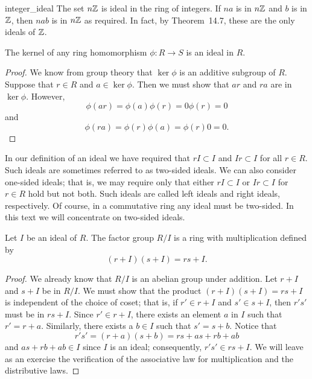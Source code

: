  
\begin{example}{integer_ideal}
The set $n {\Bbb Z}$ is ideal in the ring of integers. If $na$ is in
$n{\Bbb Z}$ and $b$ is in ${\Bbb Z}$, then $nab$ is in  $n {\Bbb Z}$
as required. In fact, by Theorem~14.7, these are the only
ideals of ${\Bbb Z}$.
\end{example}
 
 
\begin{proposition}
The kernel of any ring homomorphism $\phi : R \rightarrow S$ is an
ideal in $R$. 
\end{proposition}
 
 
\begin{proof}
We know from group theory that $\ker \phi$ is an additive subgroup of
$R$. Suppose that $r \in R$ and $a \in \ker \phi$. Then we must show
that $ar$ and $ra$ are in $\ker \phi$. However, 
\[
\phi(ar) = \phi(a) \phi(r) = 0 \phi(r) = 0
\]
and 
\[
\phi(ra) = \phi(r) \phi(a) =  \phi(r)0 = 0.
\]
\end{proof}
 
 
\medskip
 
 
In our definition of an ideal we have required that $rI \subset I$ and
$Ir \subset I$ for all $r \in R$.  Such ideals are sometimes referred
to as {\bfi two-sided ideals}.  We can also
consider {\bfi one-sided ideals}; that is,  we
may require only that either $rI \subset I$ or $Ir \subset I$ for $r
\in R$ hold but not both. Such ideals are called {\bfi left ideals\/}
and {\bfi right ideals}, respectively. Of course, in a commutative
ring any ideal must be two-sided. In this text we will concentrate on
two-sided ideals.
 

 
 
\begin{theorem}
Let $I$ be an ideal of $R$. The factor group $R/I$ is a ring with
multiplication defined by
\[
(r + I)(s + I) = rs + I.
\]
\end{theorem}
 
 
\begin{proof}
We already know that $R/I$ is an abelian group under addition. Let
$r+I$ and $s +I$ be in $R/I$. We must show that the product $(r + I)(s
+ I) = rs + I$ is independent of the choice of coset; that is, if $r' \in
r+I$ and $s' \in s+I$, then $r's'$ must be in $rs+I$. Since $r' \in
r+I$, there exists an element $a$  in $I$ such that $r' = r + a$.
Similarly, there exists a $b \in I$ such that $s' = s + b$. Notice
that 
\[
r' s' = (r+a)(s+b) = rs + as + rb + ab
\]
and $as + rb + ab \in I$ since $I$ is an ideal; consequently, $r' s'
\in rs + I$. We will leave as an exercise the verification of the 
associative law for multiplication and the distributive laws.
\end{proof}
 
